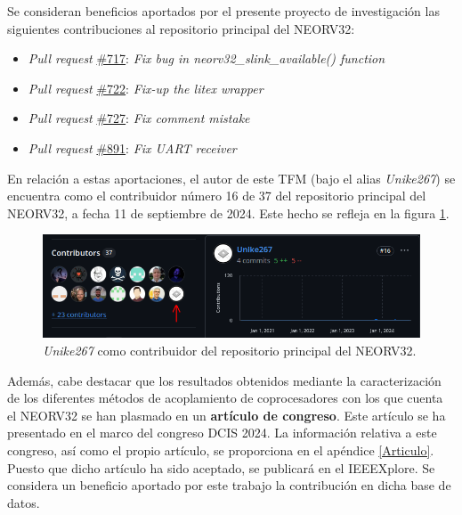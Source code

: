 \label{ben}





Se consideran beneficios aportados por el presente proyecto de investigación las siguientes contribuciones al repositorio principal del NEORV32:

\begin{itemize}
    \item \textit{Pull request} \href{https://github.com/stnolting/neorv32/pull/717}{\#717}: \textit{Fix bug in neorv32\_slink\_available() function}
    \item \textit{Pull request} \href{https://github.com/stnolting/neorv32/pull/722}{\#722}: \textit{Fix-up the litex wrapper}
    \item \textit{Pull request} \href{https://github.com/stnolting/neorv32/pull/727}{\#727}: \textit{Fix comment mistake}
    \item \textit{Pull request} \href{https://github.com/stnolting/neorv32/pull/891}{\#891}: \textit{Fix UART receiver}
\end{itemize} 

En relación a estas aportaciones, el autor de este TFM (bajo el alias \textit{Unike267}) se encuentra como el contribuidor número 16 de 37 del repositorio principal del NEORV32, a fecha 11 de septiembre de 2024. Este hecho se refleja en la figura \ref{fig:con}.

\begin{figure}[h!]
    \centering
    \includegraphics[width=14cm]{Figuras/Contributor.png}
    \caption{\textit{Unike267} como contribuidor del repositorio principal del NEORV32.}
    \label{fig:con}
\end{figure}

Además, cabe destacar que los resultados obtenidos mediante la caracterización de los diferentes métodos de acoplamiento de coprocesadores con los que cuenta el NEORV32 se han plasmado en un \textbf{artículo de congreso}. 
Este artículo se ha presentado en el marco del congreso DCIS 2024.
La información relativa a este congreso, así como el propio artículo, se proporciona en el apéndice \ref{Articulo}.
Puesto que dicho artículo ha sido aceptado, se publicará en el IEEEXplore.
Se considera un beneficio aportado por este trabajo la contribución en dicha base de datos.  

